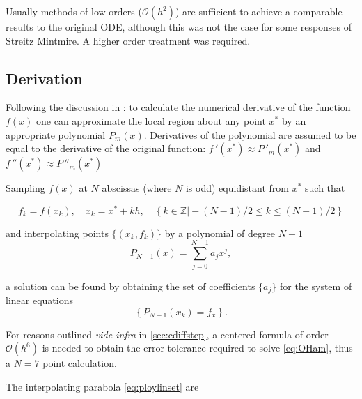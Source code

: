 Usually methods of low orders (\eg $\mathcal{O}(h^2)$) are sufficient to achieve a comparable results to the original ODE, although this was not the case for some responses of Streitz Mintmire. A higher order treatment was required.

\subsection{Derivation}
Following the discussion in : to calculate the numerical derivative of the function $f(x)$ one can approximate the local region about any point $x^*$ by an appropriate polynomial $P_m(x)$. Derivatives of the polynomial are assumed to be equal to the derivative of the original function: $f\,'(x^*)\approx P\,'_m(x^*)$ and $f\,''(x^*)\approx P\,''_m(x^*)$ \etc

Sampling $f(x)$ at $N$ abscissas (where $N$ is odd) equidistant from $x^*$ such that

\begin{equation}
f_k = f(x_k), \quad x_k=x^*+kh, \quad \left\{k \in \mathds{Z} \vert -(N-1)/2 \leq k \leq  (N-1)/2 \right\}
\end{equation}

and interpolating points $\{(x_k,f_k)\}$ by a polynomial of degree $N-1$
\begin{equation}
P_{N-1}(x)=\sum_{j=0}^{N-1} a_j x^j,
\end{equation}

a solution can be found by obtaining the set of coefficients $\{a_j\}$ for the system of linear equations
\begin{equation}
\left\{P_{N-1}(x_k)=f_x\right\}.
\label{eq:ploylinset}
\end{equation}

For reasons outlined \emph{vide infra} in \cref{sec:cdiffstep}, a centered formula of order $\mathcal{O}(h^6)$ is needed to obtain the error tolerance required to solve \cref{eq:OHam}, thus a $N=7$ point calculation.

The interpolating parabola \cref{eq:ploylinset} are


